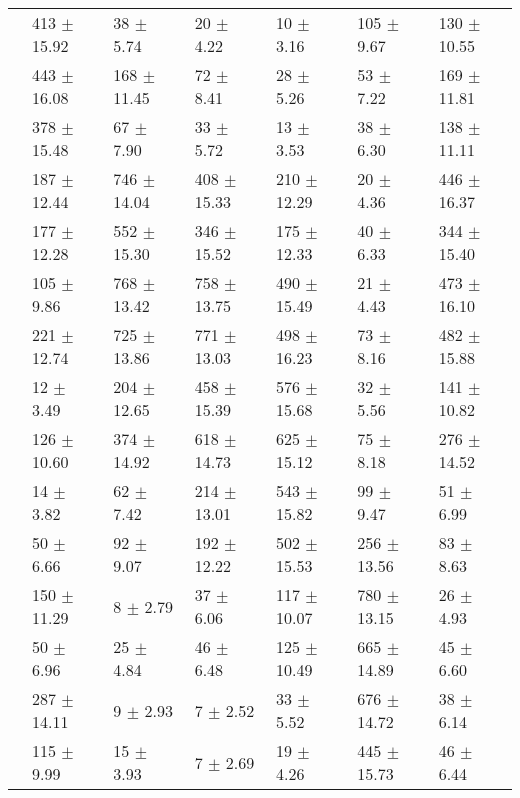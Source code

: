 \begin{table}
{\begin{tabular}[t]{rllllll}
\multirow{-2}{*}{\raggedleft\arraybackslash 7} & 413 $\pm$ 15.92 & 38 $\pm$ 5.74 & 20 $\pm$ 4.22 & 10 $\pm$ 3.16 & 105 $\pm$ 9.67 & 130 $\pm$ 10.55\\
\cmidrule{1-7}
 & 443 $\pm$ 16.08 & 168 $\pm$ 11.45 & 72 $\pm$ 8.41 & 28 $\pm$ 5.26 & 53 $\pm$ 7.22 & 169 $\pm$ 11.81\\

\multirow{-2}{*}{\raggedleft\arraybackslash 8} & 378 $\pm$ 15.48 & 67 $\pm$ 7.90 & 33 $\pm$ 5.72 & 13 $\pm$ 3.53 & 38 $\pm$ 6.30 & 138 $\pm$ 11.11\\
\cmidrule{1-7}
 & 187 $\pm$ 12.44 & 746 $\pm$ 14.04 & 408 $\pm$ 15.33 & 210 $\pm$ 12.29 & 20 $\pm$ 4.36 & 446 $\pm$ 16.37\\

\multirow{-2}{*}{\raggedleft\arraybackslash 9} & 177 $\pm$ 12.28 & 552 $\pm$ 15.30 & 346 $\pm$ 15.52 & 175 $\pm$ 12.33 & 40 $\pm$ 6.33 & 344 $\pm$ 15.40\\
\cmidrule{1-7}
 & 105 $\pm$ 9.86 & 768 $\pm$ 13.42 & 758 $\pm$ 13.75 & 490 $\pm$ 15.49 & 21 $\pm$ 4.43 & 473 $\pm$ 16.10\\

\multirow{-2}{*}{\raggedleft\arraybackslash 10} & 221 $\pm$ 12.74 & 725 $\pm$ 13.86 & 771 $\pm$ 13.03 & 498 $\pm$ 16.23 & 73 $\pm$ 8.16 & 482 $\pm$ 15.88\\
\cmidrule{1-7}
 & 12 $\pm$ 3.49 & 204 $\pm$ 12.65 & 458 $\pm$ 15.39 & 576 $\pm$ 15.68 & 32 $\pm$ 5.56 & 141 $\pm$ 10.82\\

\multirow{-2}{*}{\raggedleft\arraybackslash 11} & 126 $\pm$ 10.60 & 374 $\pm$ 14.92 & 618 $\pm$ 14.73 & 625 $\pm$ 15.12 & 75 $\pm$ 8.18 & 276 $\pm$ 14.52\\
\cmidrule{1-7}
 & 14 $\pm$ 3.82 & 62 $\pm$ 7.42 & 214 $\pm$ 13.01 & 543 $\pm$ 15.82 & 99 $\pm$ 9.47 & 51 $\pm$ 6.99\\

\multirow{-2}{*}{\raggedleft\arraybackslash 12} & 50 $\pm$ 6.66 & 92 $\pm$ 9.07 & 192 $\pm$ 12.22 & 502 $\pm$ 15.53 & 256 $\pm$ 13.56 & 83 $\pm$ 8.63\\
\cmidrule{1-7}
 & 150 $\pm$ 11.29 & 8 $\pm$ 2.79 & 37 $\pm$ 6.06 & 117 $\pm$ 10.07 & 780 $\pm$ 13.15 & 26 $\pm$ 4.93\\

\multirow{-2}{*}{\raggedleft\arraybackslash 13} & 50 $\pm$ 6.96 & 25 $\pm$ 4.84 & 46 $\pm$ 6.48 & 125 $\pm$ 10.49 & 665 $\pm$ 14.89 & 45 $\pm$ 6.60\\
\cmidrule{1-7}
 & 287 $\pm$ 14.11 & 9 $\pm$ 2.93 & 7 $\pm$ 2.52 & 33 $\pm$ 5.52 & 676 $\pm$ 14.72 & 38 $\pm$ 6.14\\

\multirow{-2}{*}{\raggedleft\arraybackslash 14} & 115 $\pm$ 9.99 & 15 $\pm$ 3.93 & 7 $\pm$ 2.69 & 19 $\pm$ 4.26 & 445 $\pm$ 15.73 & 46 $\pm$ 6.44\\
\bottomrule
\end{tabular}}
\end{table}

